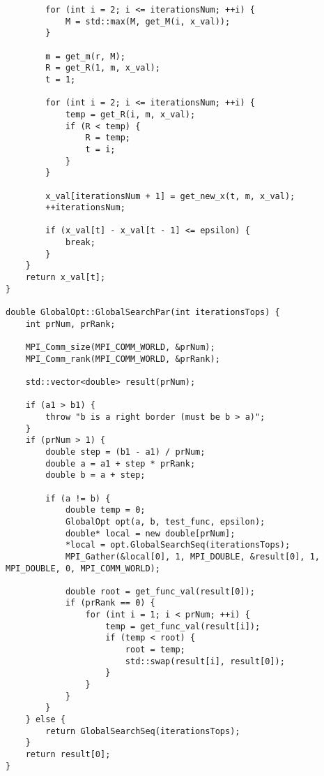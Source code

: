 \documentclass[a4paper]{report}
\begin{document}
\begin{lstlisting}
        for (int i = 2; i <= iterationsNum; ++i) {
            M = std::max(M, get_M(i, x_val));
        }

        m = get_m(r, M);
        R = get_R(1, m, x_val);
        t = 1;

        for (int i = 2; i <= iterationsNum; ++i) {
            temp = get_R(i, m, x_val);
            if (R < temp) {
                R = temp;
                t = i;
            }
        }

        x_val[iterationsNum + 1] = get_new_x(t, m, x_val);
        ++iterationsNum;

        if (x_val[t] - x_val[t - 1] <= epsilon) {
            break;
        }
    }
    return x_val[t];
}

double GlobalOpt::GlobalSearchPar(int iterationsTops) {
    int prNum, prRank;

    MPI_Comm_size(MPI_COMM_WORLD, &prNum);
    MPI_Comm_rank(MPI_COMM_WORLD, &prRank);

    std::vector<double> result(prNum);

    if (a1 > b1) {
        throw "b is a right border (must be b > a)";
    }
    if (prNum > 1) {
        double step = (b1 - a1) / prNum;
        double a = a1 + step * prRank;
        double b = a + step;

        if (a != b) {
            double temp = 0;
            GlobalOpt opt(a, b, test_func, epsilon);
            double* local = new double[prNum];
            *local = opt.GlobalSearchSeq(iterationsTops);
            MPI_Gather(&local[0], 1, MPI_DOUBLE, &result[0], 1, MPI_DOUBLE, 0, MPI_COMM_WORLD);

            double root = get_func_val(result[0]);
            if (prRank == 0) {
                for (int i = 1; i < prNum; ++i) {
                    temp = get_func_val(result[i]);
                    if (temp < root) {
                        root = temp;
                        std::swap(result[i], result[0]);
                    }
                }
            }
        }
    } else {
        return GlobalSearchSeq(iterationsTops);
    }
    return result[0];
}

\end{lstlisting}
\end{document}

